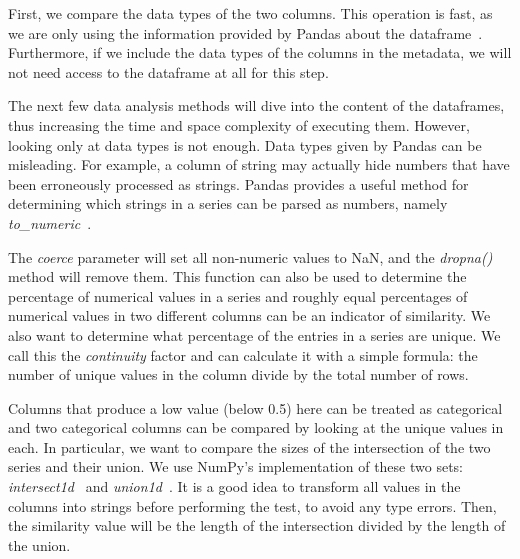 \bigbreak

First, we compare the data types of the two columns.
This operation is fast, as we are only using the information provided by Pandas about the dataframe~\cite{pandasDtypes}.
Furthermore, if we include the data types of the columns in the metadata, we will not need access to the dataframe at
all for this step.

The next few data analysis methods will dive into the content of the dataframes, thus increasing the time and space
complexity of executing them.
However, looking only at data types is not enough.
Data types given by Pandas can be misleading.
For example, a column of string may actually hide numbers that have been erroneously processed as strings.
Pandas provides a useful method for determining which strings in a series can be parsed as numbers, namely
\textit{to\_numeric}~\cite{pandasToNumeric}.

The \textit{coerce} parameter will set all non-numeric values to NaN, and the \textit{dropna()} method will remove them.
This function can also be used to determine the percentage of numerical values in a series and roughly equal
percentages of numerical values in two different columns can be an indicator of similarity.
We also want to determine what percentage of the entries in a series are unique.
We call this the \textit{continuity} factor and can calculate it with a simple formula: the number of unique values in the
column divide by the total number of rows.

Columns that produce a low value (below 0.5) here can be treated as categorical and two categorical columns can be
compared by looking at the unique values in each.
In particular, we want to compare the sizes of the intersection of the two series and their union.
We use NumPy's implementation of these two sets: \textit{intersect1d}~\cite{numpyIntersect1d} and
\textit{union1d}~\cite{numpyUnion1d}.
It is a good idea to transform all values in the columns into strings before performing the test, to avoid any type errors.
Then, the similarity value will be the length of the intersection divided by the length of the union.

